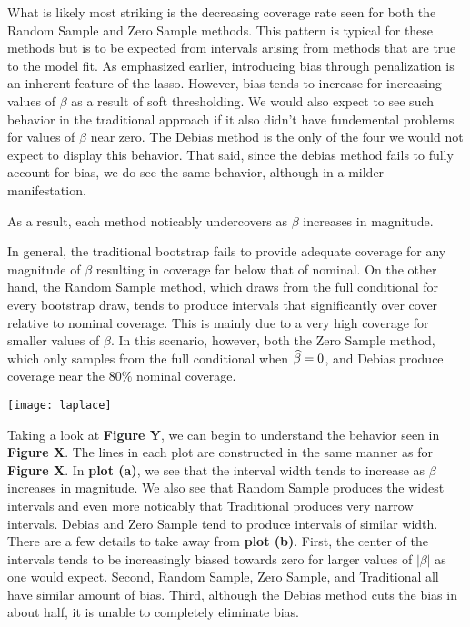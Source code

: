 What is likely most striking is the decreasing coverage rate seen for both the Random Sample and Zero Sample methods. This pattern is typical for these methods but is to be expected from intervals arising from methods that are true to the model fit. As emphasized earlier, introducing bias through penalization is an inherent feature of the lasso. However, bias tends to increase for increasing values of $\beta$ as a result of soft thresholding. We would also expect to see such behavior in the traditional approach if it also didn't have fundemental problems for values of $\beta$ near zero. The Debias method is the only of the four we would not expect to display this behavior. That said, since the debias method fails to fully account for bias, we do see the same behavior, although in a milder manifestation.

As a result, each method noticably undercovers as $\beta$ increases in magnitude.


In general, the traditional bootstrap fails to provide adequate coverage for any magnitude of $\beta$ resulting in coverage far below that of nominal. On the other hand, the Random Sample method, which draws from the full conditional for every bootstrap draw, tends to produce intervals that significantly over cover relative to nominal coverage. This is mainly due to a very high coverage for smaller values of $\beta$. In this scenario, however, both the Zero Sample method, which only samples from the full conditional when $\widehat{\beta} = 0$, and Debias produce coverage near the $80\%$ nominal coverage.

\texttt{[image: laplace]}

Taking a look at \textbf{Figure Y}, we can begin to understand the behavior seen in \textbf{Figure X}. The lines in each plot are constructed in the same manner as for \textbf{Figure X}. In \textbf{plot (a)}, we see that the interval width tends to increase as $\beta$ increases in magnitude. We also see that Random Sample produces the widest intervals and even more noticably that Traditional produces very narrow intervals. Debias and Zero Sample tend to produce intervals of similar width. There are a few details to take away from \textbf{plot (b)}. First, the center of the intervals tends to be increasingly biased towards zero for larger values of $|\beta|$ as one would expect. Second, Random Sample, Zero Sample, and Traditional all have similar amount of bias. Third, although the Debias method cuts the bias in about half, it is unable to completely eliminate bias.

